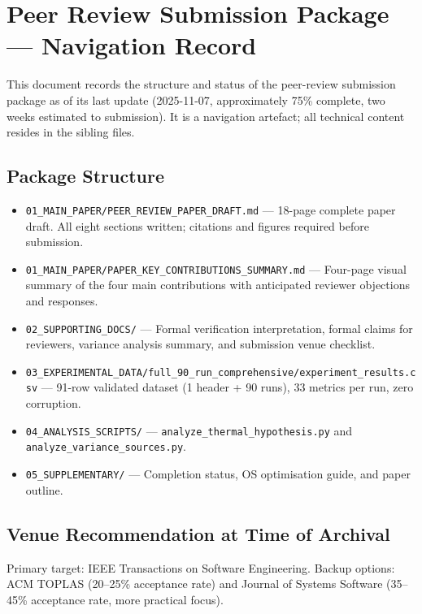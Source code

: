 
\section{Peer Review Submission Package --- Navigation Record}

This document records the structure and status of the peer-review submission package
as of its last update (2025-11-07, approximately 75\% complete, two weeks estimated
to submission). It is a navigation artefact; all technical content resides in the
sibling files.

\subsection{Package Structure}

\begin{itemize}
  \item \texttt{01\_MAIN\_PAPER/PEER\_REVIEW\_PAPER\_DRAFT.md} --- 18-page complete paper
        draft. All eight sections written; citations and figures required before
        submission.
  \item \texttt{01\_MAIN\_PAPER/PAPER\_KEY\_CONTRIBUTIONS\_SUMMARY.md} --- Four-page
        visual summary of the four main contributions with anticipated reviewer
        objections and responses.
  \item \texttt{02\_SUPPORTING\_DOCS/} --- Formal verification interpretation, formal
        claims for reviewers, variance analysis summary, and submission venue checklist.
  \item \texttt{03\_EXPERIMENTAL\_DATA/full\_90\_run\_comprehensive/experiment\_results.csv}
        --- 91-row validated dataset (1 header + 90 runs), 33 metrics per run, zero
        corruption.
  \item \texttt{04\_ANALYSIS\_SCRIPTS/} --- \texttt{analyze\_thermal\_hypothesis.py}
        and \texttt{analyze\_variance\_sources.py}.
  \item \texttt{05\_SUPPLEMENTARY/} --- Completion status, OS optimisation guide, and
        paper outline.
\end{itemize}

\subsection{Venue Recommendation at Time of Archival}

Primary target: IEEE Transactions on Software Engineering. Backup options: ACM TOPLAS
(20--25\% acceptance rate) and Journal of Systems Software (35--45\% acceptance rate,
more practical focus).

